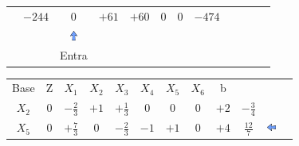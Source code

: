 \begin{frame}
{\begin{table}
\begin{tabular}{c c c c c c c c c c c c}
				& \cellcolor{gray!50} $\scriptstyle -244$
				& \cellcolor{yellow!50} $\scriptstyle 0$
				& \cellcolor{yellow!50} $\scriptstyle +61$
				& \cellcolor{yellow!50} $\scriptstyle +60$
				& \cellcolor{yellow!50} $\scriptstyle 0$
				& \cellcolor{yellow!50} $\scriptstyle 0$ 
				& \cellcolor{yellow!50} $\scriptstyle -474$  \\
				& & \includegraphics[width=0.3cm,height=0.3cm]{setacima.jpg} \\
				& & \scriptsize Entra \\
			\end{tabular}
		\end{table}			
	}
	{
		\begin{table}		
			\begin{tabular}{c c c c c c c c c c c c}
				\cellcolor{blue!100} \color{white} \scriptsize Base 
				&\cellcolor{blue!100} \color{white} \scriptsize Z 
				&\cellcolor{blue!100} \color{white} $\scriptstyle X_1$ 
				&\cellcolor{blue!100} \color{red} $\scriptstyle X_2$ 
				&\cellcolor{blue!100} \color{white}   $\scriptstyle X_3$ 
				&\cellcolor{blue!100} \color{white} $\scriptstyle X_4$ 
				&\cellcolor{blue!100} \color{red}   $\scriptstyle X_5$ 
				&\cellcolor{blue!100} \color{red}   $\scriptstyle X_6$ 
				&\cellcolor{blue!100} \color{white} \scriptsize b
				&
				&
				& \\
				\cellcolor{blue!100} \color{red} $\scriptstyle X_2$
				& \cellcolor{yellow!50} $\scriptstyle 0$
				& \cellcolor{gray!50} $\scriptstyle -\frac{2}{3}$
				& \cellcolor{yellow!50} $\scriptstyle +1$
				& \cellcolor{yellow!50} $\scriptstyle +\frac{1}{3}$
				& \cellcolor{yellow!50} $\scriptstyle 0$
				& \cellcolor{yellow!50} $\scriptstyle 0$
				& \cellcolor{yellow!50} $\scriptstyle 0$
				& \cellcolor{gray!50} $\scriptstyle +2$
				& $ \scriptstyle -\frac{3}{4}$ \\
			    \cellcolor{blue!100} \color{red} $\scriptstyle X_5$
				& \cellcolor{yellow!50} $\scriptstyle 0$
				& \cellcolor{gray!50} $\scriptstyle +\frac{7}{3}$
				& \cellcolor{yellow!50} $\scriptstyle 0$
				& \cellcolor{yellow!50} $\scriptstyle -\frac{2}{3}$			
				& \cellcolor{yellow!50} $\scriptstyle -1$
				& \cellcolor{yellow!50} $\scriptstyle +1$
				& \cellcolor{yellow!50} $\scriptstyle 0$ 
				& \cellcolor{gray!50} $\scriptstyle +4$ 
				& $ \scriptstyle \frac{12}{7}$ & \includegraphics[width=0.3cm,height=0.3cm]{setaesquerda.jpg} \\

\end{tabular}
\end{table}}
\end{frame}
